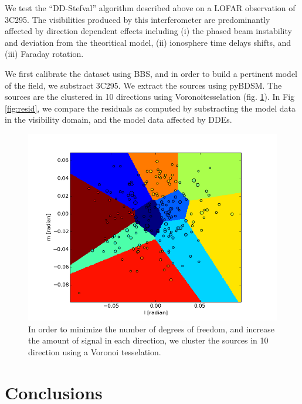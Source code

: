 \documentclass[useAMS,usenatbib]{mn2e}
\begin{document}
We test the ``DD-Stefval'' algorithm described above on a LOFAR observation of 3C295. The
visibilities produced by this interferometer are predominantly affected by direction dependent effects including (i) the phased beam instability and deviation from the
theoritical model, (ii) ionosphere time delays shifts, and (iii) Faraday rotation.

We first calibrate the dataset using BBS, and in order to build a pertinent model of the field, we substract 3C295. We extract the
sources using pyBDSM. The sources are the clustered in 10 directions using Voronoitesselation (fig. \ref{fig:tessel}). In Fig \ref{fig:resid}, we compare the residuals as
computed by substracting the model data in the visibility domain, and the model data affected by DDEs.




\begin{figure}[]
\begin{center}
\includegraphics[width=\columnwidth]{tessel}
\caption{\label{fig:tessel} In order to minimize the number of degrees
of freedom, and increase the amount of signal in each direction, we cluster the sources in 10 direction using a Voronoi
tesselation.}
\end{center}
\end{figure}



\label{sec:realdata}

\section*{Conclusions}
\end{document}
